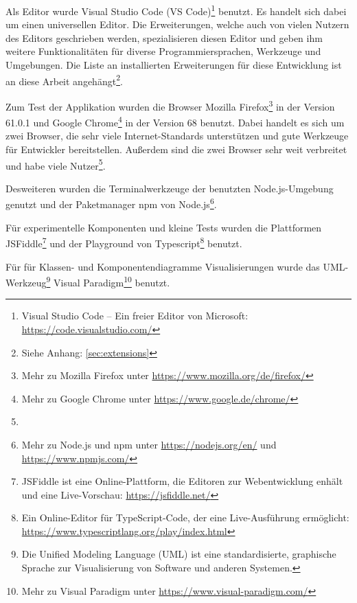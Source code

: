 Als Editor wurde Visual Studio Code (VS Code)\footnote{Visual Studio Code -- Ein freier Editor von Microsoft: \url{https://code.visualstudio.com/}} benutzt. Es handelt sich dabei um einen universellen Editor. Die Erweiterungen, welche auch von vielen Nutzern des Editors geschrieben werden, spezialisieren diesen Editor und geben ihm weitere Funktionalitäten für diverse Programmiersprachen, Werkzeuge und Umgebungen. Die Liste an installierten Erweiterungen für diese Entwicklung ist an diese Arbeit angehängt\footnote{Siehe Anhang: \ref{sec:extensions}}.

Zum Test der Applikation wurden die Browser Mozilla Firefox\footnote{Mehr zu Mozilla Firefox unter \url{https://www.mozilla.org/de/firefox/}} in der Version 61.0.1 und Google Chrome\footnote{Mehr zu Google Chrome unter \url{https://www.google.de/chrome/}} in der Version 68 benutzt. Dabei handelt es sich um zwei Browser, die sehr viele Internet-Standards unterstützen und gute Werkzeuge für Entwickler bereitstellen. Außerdem sind die zwei Browser sehr weit verbreitet und habe viele Nutzer\footnote{}.

\noindent Desweiteren wurden die Terminalwerkzeuge der benutzten Node.js-Umgebung genutzt und der Paketmanager npm von Node.js\footnote{Mehr zu Node.js und npm unter \url{https://nodejs.org/en/} und \url{https://www.npmjs.com/}}.

\noindent Für experimentelle Komponenten und kleine Tests wurden die Plattformen JSFiddle\footnote{JSFiddle ist eine Online-Plattform, die Editoren zur Webentwicklung enhält und eine Live-Vorschau: \url{https://jsfiddle.net/}} und der Playground von Typescript\footnote{Ein Online-Editor für TypeScript-Code, der eine Live-Ausführung ermöglicht: \url{https://www.typescriptlang.org/play/index.html}} benutzt.

\noindent Für für Klassen- und Komponentendiagramme \ua Visualisierungen wurde das UML-Werkzeug\footnote{Die Unified Modeling Language (UML) ist eine standardisierte, graphische Sprache zur Visualisierung von Software und anderen Systemen.} Visual Paradigm\footnote{Mehr zu Visual Paradigm unter \url{https://www.visual-paradigm.com/}} benutzt.

